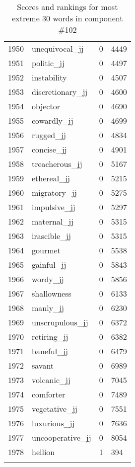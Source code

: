 \begin{longtable}[!htbp]{| rlr@{.}l |}
    1950 & unequivocal\_jj & 0 & 4449 \\
    1951 & politic\_jj & 0 & 4497 \\
    1952 & instability & 0 & 4507 \\
    1953 & discretionary\_jj & 0 & 4600 \\
    1954 & objector & 0 & 4690 \\
    1955 & cowardly\_jj & 0 & 4699 \\
    1956 & rugged\_jj & 0 & 4834 \\
    1957 & concise\_jj & 0 & 4901 \\
    1958 & treacherous\_jj & 0 & 5167 \\
    1959 & ethereal\_jj & 0 & 5215 \\
    1960 & migratory\_jj & 0 & 5275 \\
    1961 & impulsive\_jj & 0 & 5297 \\
    1962 & maternal\_jj & 0 & 5315 \\
    1963 & irascible\_jj & 0 & 5315 \\
    1964 & gourmet & 0 & 5538 \\
    1965 & gainful\_jj & 0 & 5843 \\
    1966 & wordy\_jj & 0 & 5856 \\
    1967 & shallowness & 0 & 6133 \\
    1968 & manly\_jj & 0 & 6230 \\
    1969 & unscrupulous\_jj & 0 & 6372 \\
    1970 & retiring\_jj & 0 & 6382 \\
    1971 & baneful\_jj & 0 & 6479 \\
    1972 & savant & 0 & 6989 \\
    1973 & volcanic\_jj & 0 & 7045 \\
    1974 & comforter & 0 & 7489 \\
    1975 & vegetative\_jj & 0 & 7551 \\
    1976 & luxurious\_jj & 0 & 7636 \\
    1977 & uncooperative\_jj & 0 & 8054 \\
    1978 & hellion & 1 & 394 \\
    \hline
    \caption{Scores and rankings for most extreme 30 words in component \#102} \\
\end{longtable}

